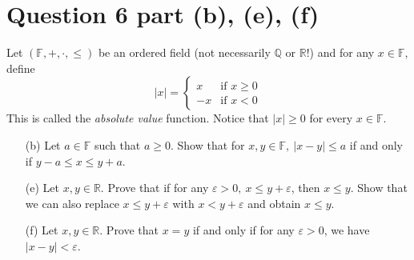 \documentclass[13pt]{article}
\begin{document}
\section*{Question 6 part (b), (e), (f)}
Let $(\mathbb{F}, +, \cdot, \leq)$ be an ordered field (not necessarily $\mathbb{Q}$ or
$\mathbb{R}$!) and for any $x \in \mathbb{F}$, define
\begin{equation}
  |x| =
  \begin{cases}
    x & \text{if } x \geq 0 \\
    -x & \text{if } x < 0
  \end{cases}
\end{equation}
This is called the \textit{absolute value} function. Notice that $|x| \geq 0$ for every $x \in
\mathbb{F}$.
\begin{enumerate}[label=(\alph*)]
\item [(b)] Let $a \in \mathbb{F}$ such that $a \geq 0$. Show that for $x, y \in \mathbb{F}, \
  |x - y| \leq a$ if and only if $y - a \leq x \leq y + a$.
\item [(e)] Let $x, y \in \mathbb{R}$. Prove that if for any $\varepsilon > 0, \ x \leq y + \varepsilon$,
  then $x \leq y$. Show that we can also replace $x \leq y + \varepsilon$ with $x < y + \varepsilon$ and
  obtain $x \leq y$.
\item [(f)] Let $x, y \in \mathbb{R}$. Prove that $x = y$ if and only if for any $\varepsilon > 0$,
  we have $|x - y| < \varepsilon$.
\end{enumerate}
\end{document}
